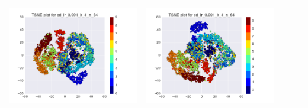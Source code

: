 \documentclass[12pt]{report}
\begin{document}
\begin{table}[H]
\begin{tabular}{ | c | c | c | c || c |}
\begin{minipage}{.3\textwidth}
      \includegraphics[scale=0.25]{cd_lr_0_001_k_4_n_64.png}
    \end{minipage} &
    \begin{minipage}{.3\textwidth}
      \includegraphics[scale=0.25]{test_cd_lr_0_001_k_4_n_64.png}
    \end{minipage}
        \\ \hline
  \end{tabular}
\end{table}
\end{document}
